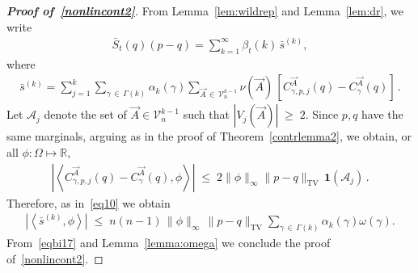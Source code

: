 \documentclass[AHL,Unicode,longabstracts,published]{cedram}
\renewcommand{\leq}{\;\leqslant\;}
\renewcommand{\geq}{\;\geqslant\;}
\newcommand{\tv}{\mathrm{TV}}
\newcommand{\ind}{\mathbf{1}}
\newcommand{\cA}{\mathcal{A}}
\newcommand{\cV}{\mathcal{V}}
\newcommand{\bbR}{\mathbb{R}}
\let\b=\beta
\let\g=\gamma
\let\o=\omega
\let\O=\Omega
\begin{document}
\begin{proof}[{\bf Proof of~\eqref{nonlincont2}}]
From Lemma~\ref{lem:wildrep} and Lemma~\ref{lem:dr}, we write
\begin{align}\label{eqbi17}
\bar S_t(q)(p-q) =\sum_{k=1}^\infty \b_t(k) \,\bar s^{(k)},
\end{align}
where
\begin{align}\label{eqbia17}
\bar s^{(k)}=\sum_{j=1}^k\sum_{\gamma\,\in\,\Gamma(k)}\alpha_k(\gamma)
\sum_{\vec A\,\in\,\cV_n^{k-1}}\nu(\vec A) \,\left[C^{\vec A}_{\gamma,p,j}(q)-C^{\vec A}_{\gamma}(q)\right]\,.
\end{align}
Let $\cA_{j}$ denote the set of $\vec A\in\cV_n^{k-1}$ such that $|V_j(\vec A)|\geq 2$. Since $p,q$ have the same marginals, arguing as in the proof of Theorem~\ref{contrlemma2}, we obtain, or all $\phi:\O\mapsto\bbR$,
\begin{align}\label{eqbas17}
\left|\left\langle C^{\vec A}_{\gamma,p,j}(q)-C^{\vec A}_{\gamma}(q), \phi\right\rangle\right|\leq 2\|\phi\|_\infty \|p-q\|_\tv\, \ind(\cA_j)\,.
\end{align}
Therefore, as in~\eqref{eq10} we obtain
\begin{align}\label{eqbas18}
\left|\left\langle \bar s^{(k)},\phi\right\rangle\right|\leq {n(n-1)}\,\|\phi\|_\infty\,\|p-q\|_\tv
\sum_{\gamma\,\in\,\Gamma(k)}\alpha_k(\gamma)
\o(\g).
\end{align}
From~\eqref{eqbi17} and Lemma~\ref{lemma:omega} we conclude the proof of~\eqref{nonlincont2}.
\end{proof}
\end{document}
